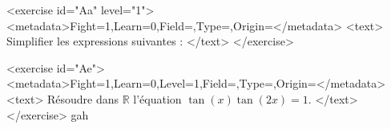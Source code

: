 <exercise id="Aa" level="1">
<metadata>Fight=1,Learn=0,Field=\NombresComplexes,Type=\Colles,Origin=</metadata>
<text>
Simplifier les expressions suivantes : 
\startformula 
{}
\stopformula </text>
</exercise>

<exercise id="Ae">
<metadata>Fight=1,Learn=0,Level=1,Field=\NombresComplexes,Type=\Colles,Origin=</metadata>
<text> 
Résoudre dans $ℝ$ l'équation $\tan(x)\tan(2x)=1$. </text>
</exercise>
gah
